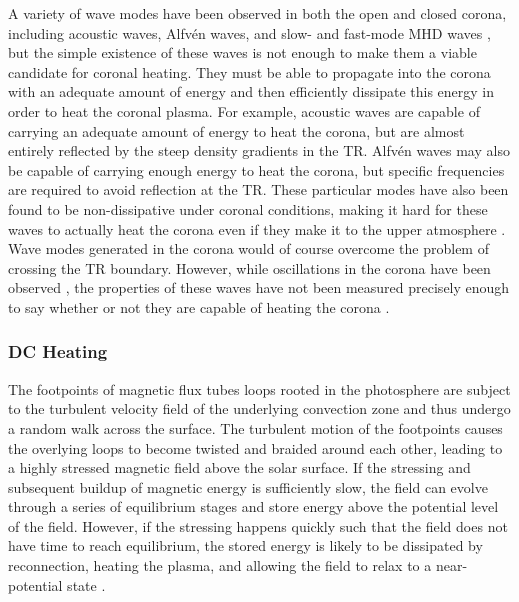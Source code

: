 A variety of wave modes have been observed in both the open and closed corona, including acoustic waves, Alfv\'{e}n waves, and slow- and fast-mode MHD waves \citep{aschwanden_physics_2006}, but the simple existence of these waves is not enough to make them a viable candidate for coronal heating. They must be able to propagate into the corona with an adequate amount of energy and then efficiently dissipate this energy in order to heat the coronal plasma. For example, acoustic waves are capable of carrying an adequate amount of energy to heat the corona, but are almost entirely reflected by the steep density gradients in the TR. Alfv\'{e}n waves may also be capable of carrying enough energy to heat the corona, but specific frequencies are required to avoid reflection at the TR. These particular modes have also been found to be non-dissipative under coronal conditions, making it hard for these waves to actually heat the corona even if they make it to the upper atmosphere \citep{klimchuk_solving_2006}. Wave modes generated in the corona would of course overcome the problem of crossing the TR boundary. However, while oscillations in the corona have been observed \citep{de_moortel_longitudinal_2002,de_moortel_longitudinal_2002-1}, the properties of these waves have not been measured precisely enough to say whether or not they are capable of heating the corona \citep{klimchuk_solving_2006}.

\subsubsection{DC Heating}\label{sec:dc-heating}

The footpoints of magnetic flux tubes loops rooted in the photosphere are subject to the turbulent velocity field of the underlying convection zone and thus undergo a random walk across the surface. The turbulent motion of the footpoints causes the overlying loops to become twisted and braided around each other, leading to a highly stressed magnetic field above the solar surface. If the stressing and subsequent buildup of magnetic energy is sufficiently slow, the field can evolve through a series of equilibrium stages and store energy above the potential level of the field. However, if the stressing happens quickly such that the field does not have time to reach equilibrium, the stored energy is likely to be dissipated by reconnection, heating the plasma, and allowing the field to relax to a near-potential state \citep{priest_magnetohydrodynamics_2014}.

